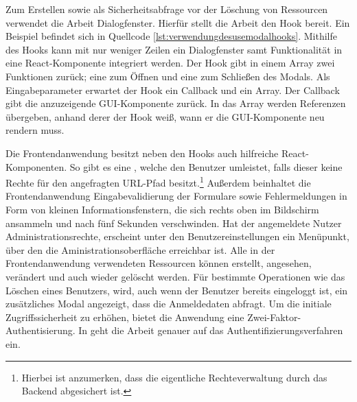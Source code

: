 Zum Erstellen sowie als Sicherheitsabfrage vor der Löschung von Ressourcen verwendet die Arbeit Dialogfenster.
Hierfür stellt die Arbeit den  Hook bereit. Ein Beispiel befindet sich in
Quellcode \ref{lst:verwendungdesusemodalhooks}. Mithilfe des Hooks
kann mit nur weniger Zeilen ein Dialogfenster samt Funktionalität in eine React-Komponente integriert werden.
Der  Hook gibt in einem Array zwei Funktionen zurück; eine zum Öffnen und eine zum
Schließen des Modals. Als Eingabeparameter erwartet der Hook ein Callback und ein Array. Der Callback
gibt die anzuzeigende GUI-Komponente zurück. In das Array werden Referenzen übergeben, anhand derer
der Hook weiß, wann er die GUI-Komponente neu rendern muss.

Die Frontendanwendung besitzt neben den Hooks auch hilfreiche React-Komponenten. So gibt es
eine , welche den Benutzer umleistet, falls dieser keine Rechte für den
angefragten URL-Pfad besitzt.\footnote{Hierbei ist anzumerken, dass die eigentliche Rechteverwaltung durch
das Backend abgesichert ist.} Außerdem beinhaltet die Frontendanwendung Eingabevalidierung der Formulare
sowie Fehlermeldungen in Form von kleinen Informationsfenstern, die sich rechts oben im Bildschirm ansammeln
und nach fünf Sekunden verschwinden. Hat der angemeldete Nutzer Administrationsrechte, erscheint unter den
Benutzereinstellungen ein Menüpunkt, über den die Aministrationsoberfläche erreichbar ist. Alle in der
Frontendanwendung verwendeten Ressourcen können erstellt, angesehen, verändert und auch wieder gelöscht werden.
Für bestimmte Operationen wie das Löschen eines Benutzers, wird, auch wenn der Benutzer bereits eingeloggt ist,
ein zusätzliches Modal angezeigt, dass die Anmeldedaten abfragt. Um die initiale Zugriffssicherheit zu erhöhen,
bietet die Anwendung eine Zwei-Faktor-Authentisierung. In  geht die
Arbeit genauer auf das Authentifizierungsverfahren ein.


